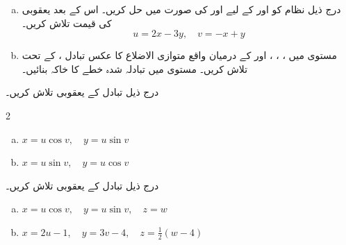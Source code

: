 \begin{enumerate}[a.]
\item
درج ذیل نظام کو  اور  کے لیے  اور  کی صورت میں حل کریں۔ اس کے بعد یعقوبی  کی قیمت تلاش کریں۔
\[u=2x-3y,\quad v=-x+y\]
\item
مستوی  میں    ،   ، ،  اور    کے درمیان واقع متوازی  الاضلاع کا عکس تبادل ،  کے تحت  تلاش کریں۔ مستوی  میں تبادلہ شدہ  خطے کا خاکہ بنائیں۔
\end{enumerate}
درج ذیل تبادل کے یعقوبی تلاش کریں۔
\begin{multicols}{2}
\begin{enumerate}[a.]
\item
\(x=u\cos v,\quad y=u\sin v\)
\item
\(x=u\sin v,\quad y=u\cos v\)
\end{enumerate}
\end{multicols}
درج ذیل تبادل کے یعقوبی تلاش کریں۔
\begin{enumerate}[a.]
\item
\(x=u\cos v,\quad y=u\sin v,\quad z=w\)
\item
\(x=2u-1,\quad y=3v-4,\quad z=\frac{1}{2}(w-4)\)
\end{enumerate}

